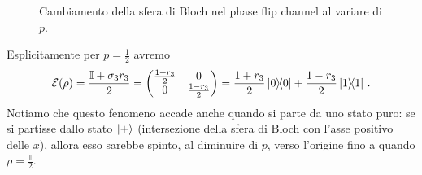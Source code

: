 \begin{esempio}
\begin{figure}[!ht]
	\centering	
	 \quad
	\caption{Cambiamento della sfera di Bloch nel phase flip channel al variare di $p$.}
    \label{fig:phase_flip_Bloch}
    \end{figure}
    
    \noindent Esplicitamente per $p = \frac{1}{2}$ avremo
    \begin{equation*}
        \mathcal{E}(\rho) = \frac{\mathbb{I}+ \sigma_3 r_3}{2} = 
        \begin{pmatrix}
            \frac{1+r_3}{2} & 0 \\ 0 & \frac{1-r_3}{2}
        \end{pmatrix}
        = \frac{1+r_3}{2} \ketbra{0} + \frac{1-r_3}{2} \ketbra{1} \, .
    \end{equation*}
    Notiamo che questo fenomeno accade anche quando si parte da uno stato puro: se si partisse dallo stato $\ket{+}$ (intersezione della sfera di Bloch con l'asse positivo delle $x$), allora esso sarebbe spinto, al diminuire di $p$, verso l'origine fino a quando $\rho = \frac{\mathbb{I}}{2}$.
\end{esempio}

